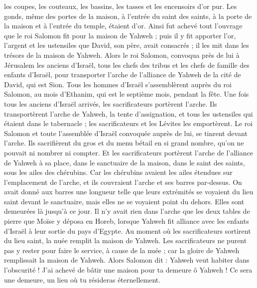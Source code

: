 \begin{multicols}{2}
les coupes, les couteaux, les bassins, les tasses et les encensoirs d'or pur. Les gonds, même des portes de la maison, à l'entrée du saint des saints, à la porte de la maison et à l'entrée du temple, étaient d'or.
Ainsi fut achevé tout l'ouvrage que le roi Salomon fit pour la maison de Yahweh ; puis il y fit apporter l'or, l'argent et les ustensiles que David, son père, avait consacrés ; il les mit dans les trésors de la maison de Yahweh.
\VerseOne{}Alors le roi Salomon, convoqua près de lui à Jérusalem les anciens d'Israël, tous les chefs des tribus et les chefs de famille des enfants d'Israël, pour transporter l'arche de l'alliance de Yahweh de la cité de David, qui est Sion.
Tous les hommes d'Israël s'assemblèrent auprès du roi Salomon, au mois d'Ethanim, qui est le septième mois, pendant la fête.
Une fois tous les anciens d'Israël arrivés, les sacrificateurs portèrent l'arche.
Ils transportèrent l'arche de Yahweh, la tente d'assignation, et tous les ustensiles qui étaient dans le tabernacle ; les sacrificateurs et les Lévites les emportèrent.
Le roi Salomon et toute l'assemblée d'Israël convoquée auprès de lui, se tinrent devant l'arche. Ils sacrifièrent du gros et du menu bétail en si grand nombre, qu'on ne pouvait ni nombrer ni compter.
Et les sacrificateurs portèrent l'arche de l'alliance de Yahweh à sa place, dans le sanctuaire de la maison, dans le saint des saints, sous les ailes des chérubins.
Car les chérubins avaient les ailes étendues sur l'emplacement de l'arche, et ils couvraient l'arche et ses barres par-dessus.
On avait donné aux barres une longueur telle que leurs extrémités se voyaient du lieu saint devant le sanctuaire, mais elles ne se voyaient point du dehors. Elles sont demeurées là jusqu'à ce jour.
Il n'y avait rien dans l'arche que les deux tables de pierre que Moïse y déposa en Horeb, lorsque Yahweh fit alliance avec les enfants d'Israël à leur sortie du pays d'Egypte.
Au moment où les sacrificateurs sortirent du lieu saint, la nuée remplit la maison de Yahweh.
Les sacrificateurs ne purent pas y rester pour faire le service, à cause de la nuée ; car la gloire de Yahweh remplissait la maison de Yahweh.
Alors Salomon dit : Yahweh veut habiter dans l'obscurité !
J'ai achevé de bâtir une maison pour ta demeure ô Yahweh ! Ce sera une demeure, un lieu où tu résideras éternellement.

\end{multicols}
